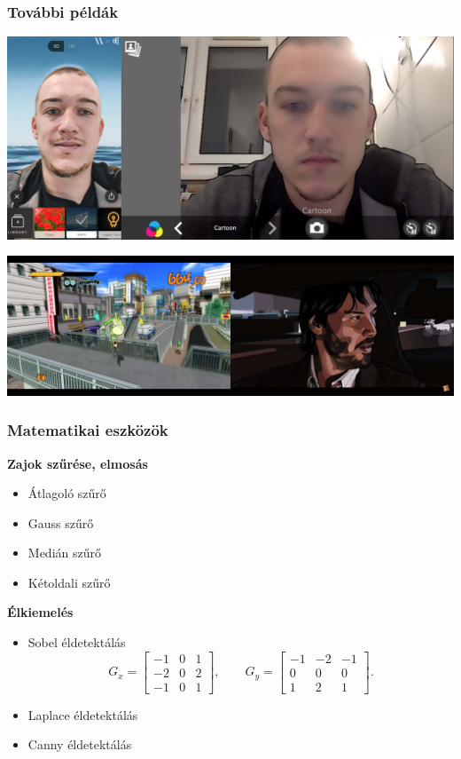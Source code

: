 \documentclass{beamer}
\begin{document}
\begin{frame}[fragile]
\frametitle{További példák}

\begin{center}
\includegraphics[scale=0.1]{kepek/prismawebcam.jpg}
\end{center}

\begin{center}
\includegraphics[scale=0.1]{kepek/jatekfilm.jpg}
\end{center}

\end{frame}

\begin{frame}[fragile]
\frametitle{Matematikai eszközök}

\textbf{Zajok szűrése, elmosás}

\begin{itemize}
\item Átlagoló szűrő
\item Gauss szűrő
\item Medián szűrő
\item Kétoldali szűrő
\end{itemize}

\bigskip

\textbf{Élkiemelés}

\begin{itemize}
\item
Sobel éldetektálás
$$
G_x =
\begin{bmatrix}
-1&0  &1 \\ 
-2&0  &2 \\ 
-1&0  &1 
\end{bmatrix},
\qquad
G_y =
\begin{bmatrix}
-1&-2  &-1 \\ 
0&0  &0 \\ 
1&2  &1 
\end{bmatrix}.
$$
\item Laplace éldetektálás
\item Canny éldetektálás
\end{itemize}

\end{frame}
\end{document}
